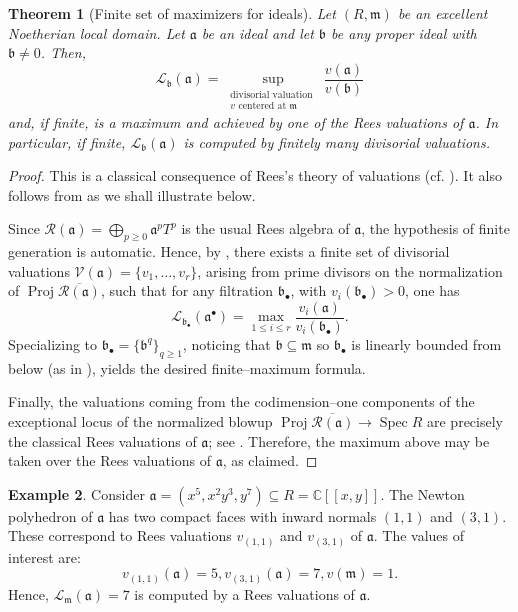 \documentclass[12pt]{amsart}
\newcommand{\CC}{\mathbb{C}}
\newcommand{\m}{\mathfrak m}
\renewcommand{\a}{\mathfrak{a}}
\renewcommand{\b}{\mathfrak{b}}
\newcommand{\R}{\mathcal{R}}
\newcommand{\Loj}{\mathcal{L}} %
\DeclareMathOperator{\Proj}{Proj}
\DeclareMathOperator{\Spec}{Spec}
\newcommand{\bbul}{{\b_\bullet}}
\theoremstyle{plain}
\newtheorem{theorem}{Theorem}[section]
\theoremstyle{definition}
\newtheorem{example}[theorem]{Example}
\numberwithin{equation}{section}
\begin{document}
\begin{theorem}[Finite set of maximizers for ideals]\label{thm:finite-max-rees}
	Let $(R,\m)$ be an excellent Noetherian local domain.
	Let $\a$ be an ideal and let $\b$ be any proper ideal with $\b\neq 0$.
	Then,
	\[
	\Loj_{\b}(\a)=\sup_{\substack{\text{divisorial valuation } \\ v \text{ centered at } \m}} \frac{v(\a)}{v(\b)}
	\]
	and, if finite, is a maximum and achieved by one of the Rees valuations of $\a$.
	In particular, if finite, $\Loj_{\b}(\a)$ is computed by finitely many divisorial valuations.
\end{theorem}

\begin{proof} This is a classical consequence of Rees's theory of valuations (cf. \cite{HS,SwansonReesValuations}). It also follows from
		 as we shall illustrate below.
		
		Since $\R(\a)=\bigoplus_{p\ge 0}\a^pT^p$ is the usual Rees algebra of $\a$, the
		hypothesis of finite generation is automatic.  Hence, by , there exists a finite set of
		divisorial valuations $\mathcal V(\a)=\{v_1,\dots,v_r\}$, arising from prime divisors on
		the normalization of $\Proj \overline{\R(\a)}$, such that for any filtration
		$\bbul$, with $v_i(\bbul) > 0$, one has
		\[
		\Loj_{\bbul}(\a^\bullet)
		=
		\max_{1\le i\le r}\frac{v_i(\a)}{v_i(\bbul)}.
		\]
		Specializing to $\bbul=\{\b^q\}_{q\ge 1}$, noticing that $\b \subseteq \m$ so $\bbul$ is linearly bounded from below (as in ), yields the desired finite--maximum formula.
		
		Finally, the valuations coming from the codimension--one components of the exceptional
		locus of the normalized blowup $\Proj \overline{\R(\a)}\to \Spec R$ are precisely
		the classical Rees valuations of $\a$; see \cite[Chapter 10]{HS}.  Therefore, the maximum above may be taken over the
		Rees valuations of $\a$, as claimed.
\end{proof}

\begin{example}
	\label{ex.finiteNormalizedBlowup}
	Consider $\a = (x^5, x^2y^3, y^7) \subseteq R = \CC[[x,y]]$. The Newton polyhedron of $\a$ has two compact faces with inward normals $(1,1)$ and $(3,1)$. These correspond to Rees valuations $v_{(1,1)}$ and $v_{(3,1)}$ of $\a$. 
	The values of interest are:
	$$v_{(1,1)}(\a) = 5, v_{(3,1)}(\a) = 7, v(\m) = 1.$$
	Hence, $\Loj_{\m}(\a) = 7$ is computed by a Rees valuations of $\a$.
\end{example}
\end{document}
